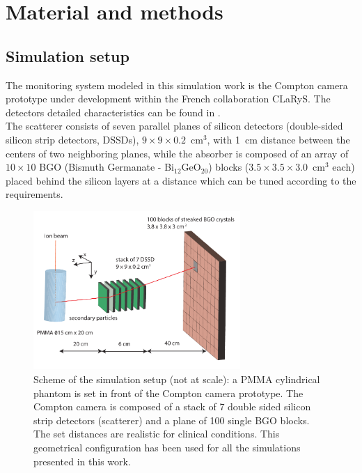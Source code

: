 
\section{Material and methods}

\subsection{Simulation setup}\label{SimuSetup}

The monitoring system modeled in this simulation work is the Compton camera prototype under development within the French collaboration CLaRyS. The detectors detailed characteristics can be found in \cite{krimmer:hal-01101334}.\\
The scatterer consists of seven parallel planes of silicon detectors (double-sided silicon strip detectors, DSSDs), $9\times9\times0.2$~cm$^3$, with 1~cm distance between the centers of two neighboring planes, while the absorber is composed of an array of $10\times10$ BGO (Bismuth Germanate - Bi$_{12}$GeO$_{20}$) blocks ($3.5\times3.5\times3.0$~cm$^3$ each) placed behind the silicon layers at a distance which can be tuned according to the requirements.

\begin{figure}	
  \centering
  \includegraphics[width=0.7\textwidth]{./Figure/Compton_Camera_hadontherapy_PMMA_Cylinder_EN.pdf}
  \caption{Scheme of the simulation setup (not at scale): a PMMA cylindrical phantom is set in front of the Compton camera prototype. The Compton camera is composed of a stack of 7 double sided silicon strip detectors (scatterer) and a plane of 100 single BGO blocks. The set distances are realistic for clinical conditions. This geometrical configuration has been used for all the simulations presented in this work.}
  \label{fig:fig_setup_CC_simulation_Hadronth}
\end{figure}

